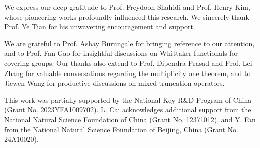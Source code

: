 \documentclass[11pt,reqno]{amsart}
\newcommand{\sk}{\medskip}\newcommand{\bsk}{\bigskip}
\newcommand{\s}{\sk\noindent}\newcommand{\bigs}{\bsk\noindent}
\theoremstyle{plain}
\theoremstyle{remark} \newtheorem{remark}[thm]{Remark}
\theoremstyle{definition} \newtheorem{exercise}[thm]{Exercise}
\theoremstyle{definition} \newtheorem{example}[thm]{Example} \newtheorem{condition}[thm]{Condition}
\numberwithin{equation}{section}
\renewcommand{\-}{\text{--}}
\begin{document}
\s{\bf Acknowledgement} 
We express our deep gratitude to Prof. Freydoon Shahidi and Prof. Henry Kim, whose pioneering works \cite{Sha88, Sha89, KS99} profoundly influenced this research. We sincerely thank Prof. Ye Tian for his unwavering encouragement and support.  

We are grateful to Prof. Ashay Burungale for bringing reference \cite{HJL23} to our attention, and to Prof. Fan Gao for insightful discussions on Whittaker functionals for covering groups. Our thanks also extend to Prof. Dipendra Prasad and Prof. Lei Zhang for valuable conversations regarding the multiplicity one theorem, and to Jiewen Wang for productive discussions on mixed truncation operators. 

This work was partially supported by the National Key R\&D Program of China (Grant No. 2023YFA1009702). L. Cai acknowledges additional support from the National Natural Science Foundation of China (Grant No. 12371012), and Y. Fan from the National Natural Science Foundation of Beijing, China (Grant No. 24A10020).
\end{document}
